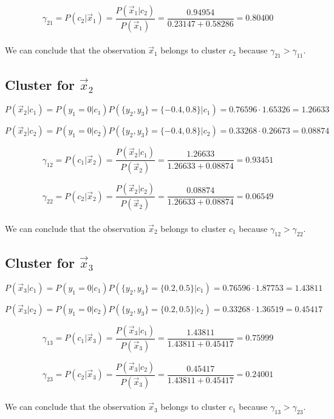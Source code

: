 \documentclass{article}
\begin{document}
\[ \gamma_{21} = P(c_2| \vec{x}_1) = \frac{P(\vec{x}_1 | c_2)}{P(\vec{x}_1)} = \frac{0.94954}{0.23147 + 0.58286} = 0.80400 \]

\paragraph{} We can conclude that the observation $\vec{x}_1$ belongs to cluster $c_2$ because $\gamma_{21} > \gamma_{11}$.

\subsection*{Cluster for $\vec{x}_2$}

\[ P(\vec{x}_2 | c_1) = P(y_1 = 0 | c_1) P(\{y_2, y_3\}  = \{-0.4, 0.8\} | c_1) = 0.76596 \cdot 1.65326   = 1.26633 \]

\[ P(\vec{x}_2 | c_2) = P(y_1 = 0 | c_2) P(\{y_2, y_3\}  = \{-0.4, 0.8\} | c_2) = 0.33268 \cdot 0.26673   = 0.08874 \]

\[ \gamma_{12} = P(c_1| \vec{x}_2) = \frac{P(\vec{x}_2 | c_1)}{P(\vec{x}_2)} = \frac{1.26633}{1.26633 + 0.08874} = 0.93451 \]

\[ \gamma_{22} = P(c_2| \vec{x}_2) = \frac{P(\vec{x}_2 | c_2)}{P(\vec{x}_2)} = \frac{0.08874}{1.26633 + 0.08874} = 0.06549 \]

\paragraph{} We can conclude that the observation $\vec{x}_2$ belongs to cluster $c_1$ because $\gamma_{12} > \gamma_{22}$.

\subsection*{Cluster for $\vec{x}_3$}

\[ P(\vec{x}_3 | c_1) = P(y_1 = 0 | c_1) P(\{y_2, y_3\}  = \{0.2, 0.5\} | c_1) = 0.76596 \cdot 1.87753  = 1.43811 \]

\[ P(\vec{x}_3 | c_2) = P(y_1 = 0 | c_2) P(\{y_2, y_3\}  = \{0.2, 0.5\} | c_2) = 0.33268 \cdot 1.36519  = 0.45417 \]

\[ \gamma_{13} = P(c_1| \vec{x}_3) = \frac{P(\vec{x}_3 | c_1)}{P(\vec{x}_3)} = \frac{1.43811}{1.43811 + 0.45417} = 0.75999 \]

\[ \gamma_{23} = P(c_2| \vec{x}_3) = \frac{P(\vec{x}_3 | c_2)}{P(\vec{x}_3)} = \frac{0.45417}{1.43811 + 0.45417} = 0.24001 \]

\paragraph{} We can conclude that the observation $\vec{x}_3$ belongs to cluster $c_1$ because $\gamma_{13} > \gamma_{23}$.
\end{document}
